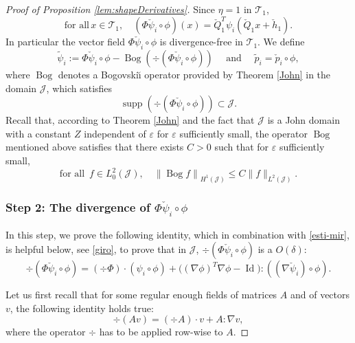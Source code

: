 \documentclass[11pt]{article}
\providecommand{\widecheck}{\check}
\let\eps\varepsilon
\DeclareMathOperator{\Bog}{Bog}
\DeclareMathOperator{\Id}{Id}
\DeclareMathOperator{\supp}{supp}
\theoremstyle{definition}
\theoremstyle{remark}
\begin{document}
\begin{proof}[Proof of Proposition \ref{lem:shapeDerivatives}]
Since $\eta = 1$ in $\mathcal T_1$,
\begin{equation} \label{soliv-v}
\text{for all} \, x \in \mathcal T_1, \quad
(\Phi \widecheck \psi_i \circ \phi)(x) = \widecheck Q_1^T \psi_i (\widecheck Q_1 x + \widecheck h_1).
\end{equation}
In particular the vector field
$\Phi \widecheck \psi_i \circ \phi$ is divergence-free in $\mathcal T_1$.
We define
\begin{equation} \label{kejetrans}
\tilde \psi_i := \Phi \widecheck \psi_i \circ \phi - \Bog (\div (\Phi \widecheck \psi_i \circ \phi)) \quad \text{ and } \quad
\tilde p_i = \widecheck p_i \circ \phi,
\end{equation}
where $\Bog$ denotes a Bogovski\u{\i} operator provided by Theorem \ref{John} in the domain $\mathcal J$, which satisfies
\begin{equation}\label{support}
\supp(\div(\Phi \widecheck \psi_i \circ \phi)) \subset \mathcal J.
\end{equation}
Recall that, according to Theorem \ref{John} and the fact that
$\mathcal J$ is a John domain with a constant $Z$ independent of $\eps$ for $\eps$ sufficiently small, the operator $\Bog$ mentioned above satisfies that there exists $C>0$ such that for $\eps$ sufficiently small,
\begin{equation} \label{Bog-J}
\text{for all } \, f \in L^2_0(\mathcal J), \quad \left\|\Bog f\right\|_{H^1 (\mathcal J) } \leq C \|f \|_{L^2 (\mathcal J)}.
\end{equation}

\subsubsection*{Step 2: The divergence of $\Phi \widecheck \psi_i \circ \phi$} In this step, we prove the following identity, which in combination with \eqref{esti-mir}, is helpful below, see \eqref{giro}, to prove that in $\mathcal J$,
$\div (\Phi \widecheck \psi_i \circ \phi)$ is a $O(\delta)$:
\begin{equation}\label{idenden}
\div (\Phi \widecheck \psi_i \circ \phi) =
(\div \Phi) \cdot (\psi_i \circ \phi) +
\Big(
(\nabla \phi)^T \nabla \phi - \Id \Big) : ((\nabla \widecheck \psi_i) \circ \phi).
\end{equation}

Let us first recall that for some regular enough fields of matrices $A$ and of vectors $v$, the following identity holds true:
\begin{equation} \label{piola}
\div (Av) = (\div A) \cdot v + A : \nabla v,
\end{equation}
where the operator $\div$ has to be applied row-wise to $A$.


\end{proof}
\end{document}
